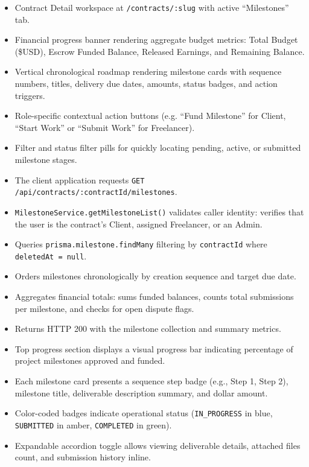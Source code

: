 \begin{itemize}[leftmargin=1.6em,topsep=3pt,itemsep=2pt,parsep=0pt,label=$\bullet$]
      \item Contract Detail workspace at \texttt{/contracts/:slug} with active ``Milestones'' tab.
      \item Financial progress banner rendering aggregate budget metrics: Total Budget (\$USD), Escrow Funded Balance, Released Earnings, and Remaining Balance.
      \item Vertical chronological roadmap rendering milestone cards with sequence numbers, titles, delivery due dates, amounts, status badges, and action triggers.
      \item Role-specific contextual action buttons (e.g. ``Fund Milestone'' for Client, ``Start Work'' or ``Submit Work'' for Freelancer).
      \item Filter and status filter pills for quickly locating pending, active, or submitted milestone stages.
\end{itemize}

\begin{itemize}[leftmargin=1.6em,topsep=3pt,itemsep=2pt,parsep=0pt,label=$\bullet$]
      \item The client application requests \texttt{GET /api/contracts/:contractId/milestones}.
      \item \texttt{MilestoneService.getMilestoneList()} validates caller identity: verifies that the user is the contract's Client, assigned Freelancer, or an Admin.
      \item Queries \texttt{prisma.milestone.findMany} filtering by \texttt{contractId} where \texttt{deletedAt = null}.
      \item Orders milestones chronologically by creation sequence and target due date.
      \item Aggregates financial totals: sums funded balances, counts total submissions per milestone, and checks for open dispute flags.
      \item Returns HTTP 200 with the milestone collection and summary metrics.
\end{itemize}

\begin{itemize}[leftmargin=1.6em,topsep=3pt,itemsep=2pt,parsep=0pt,label=$\bullet$]
      \item Top progress section displays a visual progress bar indicating percentage of project milestones approved and funded.
      \item Each milestone card presents a sequence step badge (e.g., Step 1, Step 2), milestone title, deliverable description summary, and dollar amount.
      \item Color-coded badges indicate operational status (\texttt{IN\_PROGRESS} in blue, \texttt{SUBMITTED} in amber, \texttt{COMPLETED} in green).
      \item Expandable accordion toggle allows viewing deliverable details, attached files count, and submission history inline.
\end{itemize}

